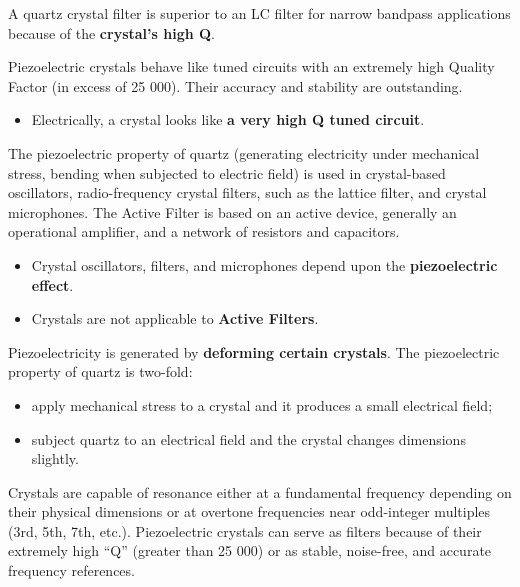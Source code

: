 \documentclass[letterpaper]{article}
\begin{document}
        A quartz crystal filter is superior to an LC filter for narrow bandpass applications because of the \textbf{crystal's high Q}.

        Piezoelectric crystals behave like tuned circuits with an extremely high Quality Factor (in excess of 25 000).  Their accuracy and stability are outstanding.
        \begin{itemize}
            \item Electrically, a crystal looks like \textbf{a very high Q tuned circuit}.
        \end{itemize}

        The piezoelectric property of quartz (generating electricity under mechanical stress, bending when subjected to electric field) is used in crystal-based oscillators, radio-frequency crystal filters, such as the lattice filter, and crystal microphones.
        The Active Filter is based on an active device, generally an operational amplifier, and a network of resistors and capacitors.
        \begin{itemize}
            \item Crystal oscillators, filters, and microphones depend upon the \textbf{piezoelectric effect}.
            \item Crystals are not applicable to \textbf{Active Filters}.
        \end{itemize}

        Piezoelectricity is generated by \textbf{deforming certain crystals}.
        The piezoelectric property of quartz is two-fold:
        \begin{itemize}
            \item apply mechanical stress to a crystal and it produces a small electrical field;
            \item subject quartz to an electrical field and the crystal changes dimensions slightly.
        \end{itemize}

        Crystals are capable of resonance either at a fundamental frequency depending on their physical dimensions or at overtone frequencies near odd-integer multiples (3rd, 5th, 7th, etc.).
        Piezoelectric crystals can serve as filters because of their extremely high ``Q'' (greater than 25 000) or as stable, noise-free, and accurate frequency references.
\end{document}
